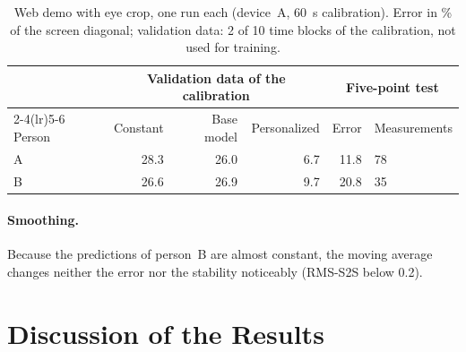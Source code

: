 \begin{table}[htbp]
  \centering
  \caption[Web demo with both persons]{Web demo with eye crop, one run each (device~A,
           \SI{60}{\second} calibration). Error in \si{\percent} of the screen
           diagonal; validation data: 2 of 10 time blocks of the calibration,
           not used for training.}
  \label{tab:demo_persons}
  \small
  \begin{tabular}{l rrr rl}
    \toprule
    & \multicolumn{3}{c}{Validation data of the calibration} & \multicolumn{2}{c}{Five-point test} \\
    \cmidrule(lr){2-4}\cmidrule(lr){5-6}
    Person & Constant & Base model & Personalized & Error & Measurements \\
    \midrule
    A & 28.3 & 26.0 & 6.7 & 11.8 & 78 \\
    B & 26.6 & 26.9 & 9.7 & 20.8 & 35 \\
    \bottomrule
  \end{tabular}
\end{table}

\paragraph{Smoothing.} Because the predictions of person~B are almost constant,
the moving average changes neither the error nor the stability noticeably
(RMS-S2S below \num{0.2}).

\section{Discussion of the Results}
\label{sec:discussion}

